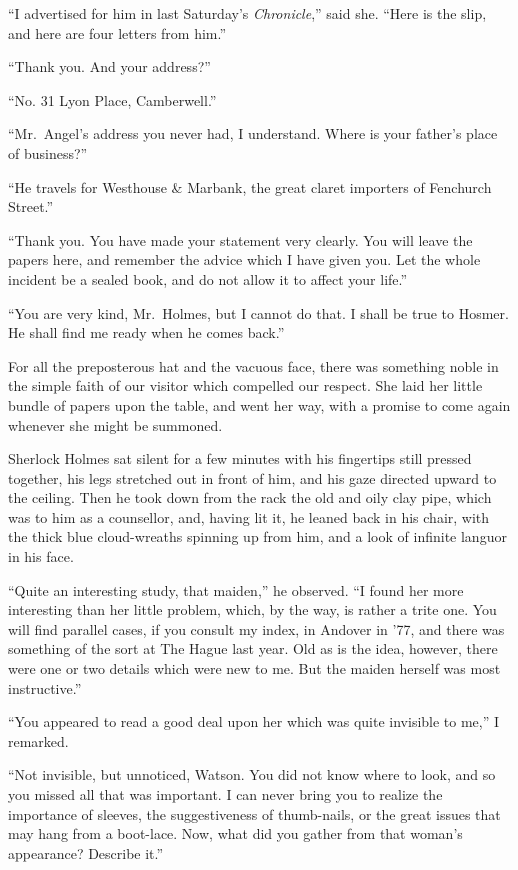 “I advertised for him in last Saturday’s \textit{Chronicle},” said
she. “Here is the slip, and here are four letters from him.”

“Thank you. And your address?”

“No. 31 Lyon Place, Camberwell.”

“Mr.~Angel’s address you never had, I understand. Where
is your father’s place of business?”

“He travels for Westhouse \& Marbank, the great claret importers
of Fenchurch Street.”

“Thank you. You have made your statement very clearly.
You will leave the papers here, and remember the advice
which I have given you. Let the whole incident be a sealed
book, and do not allow it to affect your life.”

“You are very kind, Mr.~Holmes, but I cannot do that. I
shall be true to Hosmer. He shall find me ready when he
comes back.”

For all the preposterous hat and the vacuous face, there was
something noble in the simple faith of our visitor which compelled
our respect. She laid her little bundle of papers upon
the table, and went her way, with a promise to come again
whenever she might be summoned.

Sherlock Holmes sat silent for a few minutes with his fingertips
still pressed together, his legs stretched out in front of
him, and his gaze directed upward to the ceiling. Then he
took down from the rack the old and oily clay pipe, which was
to him as a counsellor, and, having lit it, he leaned back in
his chair, with the thick blue cloud-wreaths spinning up from
him, and a look of infinite languor in his face.

“Quite an interesting study, that maiden,” he observed. “I
found her more interesting than her little problem, which, by
the way, is rather a trite one. You will find parallel cases, if
you consult my index, in Andover in ’77, and there was something
of the sort at The Hague last year. Old as is the idea,
however, there were one or two details which were new to me.
But the maiden herself was most instructive.”

“You appeared to read a good deal upon her which was
quite invisible to me,” I remarked.

“Not invisible, but unnoticed, Watson. You did not know
where to look, and so you missed all that was important. I
can never bring you to realize the importance of sleeves, the
suggestiveness of thumb-nails, or the great issues that may
hang from a boot-lace. Now, what did you gather from that
woman’s appearance? Describe it.”

